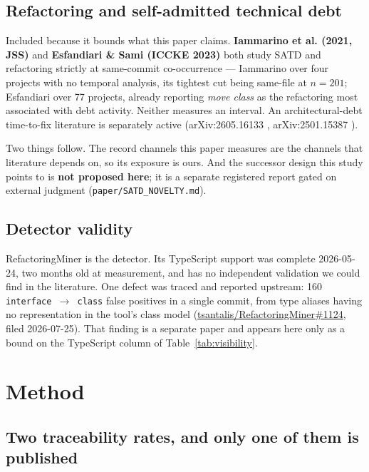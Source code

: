 \documentclass[conference]{IEEEtran}
\begin{document}
\subsection{Refactoring and self-admitted technical debt}
\label{sec:2.5}

Included because it bounds what this paper claims. \textbf{Iammarino et al. (2021, JSS)} \cite{iammarino2021empirical} and \textbf{Esfandiari \& Sami (ICCKE 2023)} \cite{esfandiari2023exploratory} both study SATD and refactoring strictly at same-commit co-occurrence --- Iammarino over four projects with no temporal analysis, its tightest cut being same-file at $n=201$; Esfandiari over 77 projects, already reporting \emph{move class} as the refactoring most associated with debt activity. Neither measures an interval. An architectural-debt time-to-fix literature is separately active (arXiv:2605.16133 \cite{sutoyo2026dangers}, arXiv:2501.15387 \cite{sutoyo2025tracing}).

Two things follow. The record channels this paper measures are the channels that literature depends on, so its exposure is ours. And the successor design this study points to is \textbf{not proposed here}; it is a separate registered report gated on external judgment (\texttt{paper/\allowbreak{}SATD\_\allowbreak{}NOVELTY.\allowbreak{}md}).

\subsection{Detector validity}
\label{sec:2.6}

RefactoringMiner \cite{tsantalis2026refactoringminer} is the detector. Its TypeScript support was complete 2026-05-24, two months old at measurement, and has no independent validation we could find in the literature. One defect was traced and reported upstream: 160 \texttt{interface $\rightarrow$ class} false positives in a single commit, from type aliases having no representation in the tool's class model (\href{https://github.com/tsantalis/RefactoringMiner/issues/1124}{tsantalis/RefactoringMiner\#1124}, filed 2026-07-25). That finding is a separate paper and appears here only as a bound on the TypeScript column of Table~\ref{tab:visibility}.


\section{Method}
\label{sec:3}

\subsection{Two traceability rates, and only one of them is published}
\label{sec:3.1}
\end{document}
